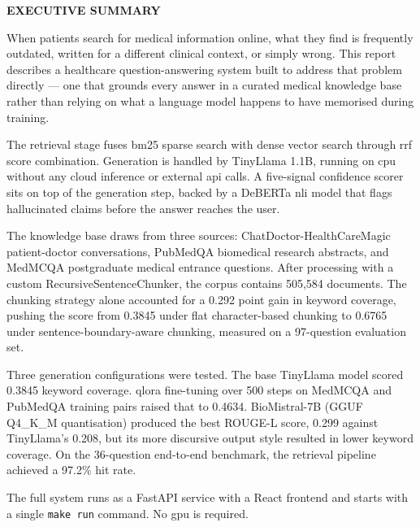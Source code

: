 \begin{center}
	\Large{\textbf{EXECUTIVE SUMMARY}}
\end{center}
\vspace{1em}
\normalsize

When patients search for medical information online, what they find is frequently outdated, written for a different clinical context, or simply wrong. This report describes a healthcare question-answering system built to address that problem directly --- one that grounds every answer in a curated medical knowledge base rather than relying on what a language model happens to have memorised during training.

The retrieval stage fuses \ac{bm25} sparse search with dense vector search through \ac{rrf} score combination. Generation is handled by TinyLlama 1.1B, running on \ac{cpu} without any cloud inference or external \ac{api} calls. A five-signal confidence scorer sits on top of the generation step, backed by a DeBERTa \ac{nli} model that flags hallucinated claims before the answer reaches the user.

The knowledge base draws from three sources: ChatDoctor-HealthCareMagic patient-doctor conversations, PubMedQA biomedical research abstracts, and MedMCQA postgraduate medical entrance questions. After processing with a custom RecursiveSentenceChunker, the corpus contains 505,584 documents. The chunking strategy alone accounted for a 0.292 point gain in keyword coverage, pushing the score from 0.3845 under flat character-based chunking to 0.6765 under sentence-boundary-aware chunking, measured on a 97-question evaluation set.

Three generation configurations were tested. The base TinyLlama model scored 0.3845 keyword coverage. \ac{qlora} fine-tuning over 500 steps on MedMCQA and PubMedQA training pairs raised that to 0.4634. BioMistral-7B (GGUF Q4\_K\_M quantisation) produced the best ROUGE-L score, 0.299 against TinyLlama's 0.208, but its more discursive output style resulted in lower keyword coverage. On the 36-question end-to-end benchmark, the retrieval pipeline achieved a 97.2\% hit rate.

The full system runs as a FastAPI service with a React frontend and starts with a single \texttt{make run} command. No \ac{gpu} is required.
